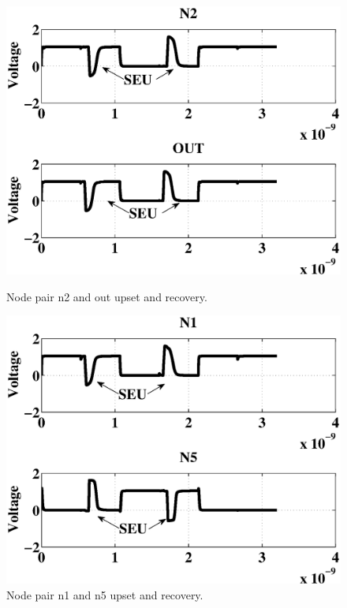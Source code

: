 \begin{figure}[!htbp]
\centering
\parbox{4cm}{
\includegraphics[width=\linewidth]{Figures/WavePlots/n2out.eps}
\caption{Node pair n2 and out upset and recovery.}
\label{fig:n2out}}
\qquad
\begin{minipage}{4cm}
\includegraphics[width=\linewidth]{Figures/WavePlots/n1n5.eps}
\caption{Node pair n1 and n5 upset and recovery.}
\label{fig:n1n5}
\end{minipage}
\end{figure}

